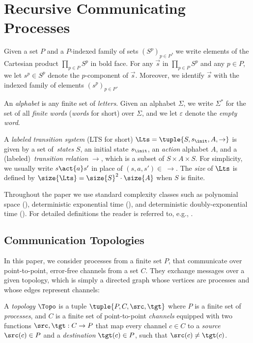 \documentclass{LMCS}
\newenvironment{definition}{\begin{defi}}{\end{defi}}
\begin{document}
 
\section{Recursive Communicating Processes}




Given a set $P$ and a $P$-indexed family of sets $(S^p)_{p \in P}$, we 
write elements of the Cartesian product $\prod_{p \in P} S^p$ in bold face.  For
any $\vec{s}$ in $\prod_{p \in P} S^p$ and any $p \in P$, we let $s^p \in S^p$
denote the $p$-component of  $\vec{s}$.  Moreover, we identify $\vec{s}$
with the indexed family of elements $(s^p)_{p \in P}$.

An \emph{alphabet} is any finite set of \emph{letters}.  Given an
alphabet $\Sigma$, we write $\Sigma^*$ for the set of all \emph{finite words}
(\emph{words} for short) over $\Sigma$, and we let $\varepsilon$ denote the
\emph{empty word}.  


A \emph{labeled transition system} (LTS for short)
$\Lts=\tuple{S,s_\init,A,\rightarrow}$ is given by a set
of~\emph{states} $S$, an initial state $s_\init$, an 
\emph{action} alphabet $A$, and a (labeled)~\emph{transition relation}
$\rightarrow$, which is a subset of $S\times A\times S$. For
simplicity, we usually write $s\act{a}s'$ in place of $(s,a,s')\in\
\rightarrow$. The \emph{size} of $\Lts$ is defined by
$\size{\Lts} = \size{S}^2 \cdot \size{A}$
when $S$ is finite.


Throughout the paper we use standard complexity classes such as
polynomial space (\pspace), deterministic exponential time (\dexptime), and
deterministic doubly-exponential time (\twodexptime).  For detailed definitions
the reader is referred to, e.g., \cite{papadimitriou-c-1994--a}.





\subsection{Communication Topologies}

In this paper, we consider processes from a finite set $P$, that
communicate over point-to-point, error-free \fifo channels from a set
$C$. They exchange messages over a given  topology, which
is simply a directed graph whose vertices are processes and whose
edges represent channels:

\begin{definition}
  A \emph{topology} $\Topo$  is a tuple $\tuple{P,C,\src,\tgt}$ where $P$
  is a finite set of \emph{processes}, and $C$ is a finite set
  of point-to-point \emph{channels} equipped with two functions
  $\src,\tgt:C\rightarrow P$ that map every channel $c\in C$ to a
  \emph{source} $\src(c) \in P$ and a \emph{destination}
  $\tgt(c) \in P$, such that $\src(c) \neq \tgt(c)$.
\end{definition}
\end{document}
